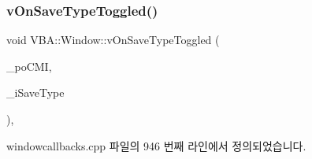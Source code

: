 \subsubsection{\texorpdfstring{v\+On\+Save\+Type\+Toggled()}{vOnSaveTypeToggled()}}
{\footnotesize\ttfamily void V\+B\+A\+::\+Window\+::v\+On\+Save\+Type\+Toggled (\begin{DoxyParamCaption}\item[{Gtk\+::\+Check\+Menu\+Item $\ast$}]{\+\_\+po\+C\+MI,  }\item[{\mbox{\hyperlink{_util_8cpp_a0ef32aa8672df19503a49fab2d0c8071}{int}}}]{\+\_\+i\+Save\+Type }\end{DoxyParamCaption})\hspace{0.3cm}{\ttfamily [protected]}, {\ttfamily [virtual]}}



windowcallbacks.\+cpp 파일의 946 번째 라인에서 정의되었습니다.


